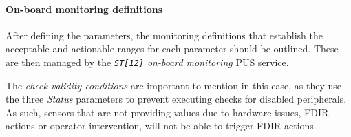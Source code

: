\documentclass[a4paper,nobib,final]{tufte-book}
\begin{document}
\paragraph{On-board monitoring definitions}

After defining the parameters, the monitoring definitions that establish the acceptable and actionable ranges for each parameter should be outlined. These are then managed by the \emph{\texttt{ST[12]} on-board monitoring} \ac{PUS} service.

The \emph{check validity conditions} are important to mention in this case, as they use the three \emph{Status} parameters to prevent executing checks for disabled peripherals. As such, sensors that are not providing values due to hardware issues, \ac{FDIR} actions or operator intervention, will not be able to trigger \ac{FDIR} actions.
\end{document}
